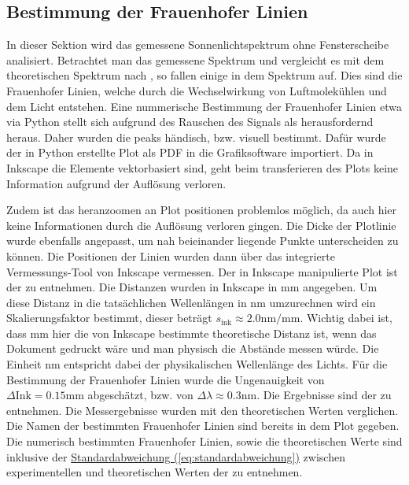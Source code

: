 \subsection{Bestimmung der Frauenhofer Linien}
In dieser Sektion wird das gemessene Sonnenlichtspektrum ohne Fensterscheibe analisiert. Betrachtet man das gemessene Spektrum und vergleicht es mit dem theoretischen Spektrum nach , so fallen einige in dem Spektrum auf. 
Dies sind die Frauenhofer Linien, welche durch die Wechselwirkung von Luftmolekühlen und dem Licht entstehen. Eine nummerische Bestimmung der Frauenhofer Linien etwa via Python stellt sich aufgrund des Rauschen des Signals als herausfordernd heraus. 
Daher wurden die peaks händisch, bzw. visuell bestimmt. Dafür wurde der in Python erstellte Plot als PDF in die Grafiksoftware importiert. Da in Inkscape die Elemente vektorbasiert sind, geht beim transferieren des Plots keine Information aufgrund der Auflösung verloren. 

Zudem ist das heranzoomen an Plot positionen problemlos möglich, da auch hier keine Informationen durch die Auflösung verloren gingen. Die Dicke der Plotlinie wurde ebenfalls angepasst, um nah beieinander liegende Punkte unterscheiden zu können.
Die Positionen der Linien wurden dann über das integrierte Vermessungs-Tool von Inkscape vermessen. Der in Inkscape manipulierte Plot ist der  zu entnehmen. 
Die Distanzen wurden in Inkscape in mm angegeben. Um diese Distanz in die tatsächlichen Wellenlängen in nm umzurechnen wird ein Skalierungsfaktor bestimmt, dieser beträgt $s_\text{ink} \approx 2.0 \mathrm{nm/mm}$. Wichtig dabei ist, dass mm hier die von Inkscape bestimmte theoretische Distanz ist, wenn das Dokument gedruckt wäre und man physisch die Abstände messen würde. Die Einheit nm entspricht dabei der physikalischen Wellenlänge des Lichts.
Für die Bestimmung der Frauenhofer Linien wurde die Ungenauigkeit von $\Delta \text{Ink} = 0.15 \mathrm{mm}$ abgeschätzt, bzw. von $\Delta \lambda \approx 0.3 \mathrm{nm}$. Die Ergebnisse sind der  zu entnehmen. 
Die Messergebnisse wurden mit den theoretischen Werten verglichen. \cite{wikiFL}
Die Namen der bestimmten Frauenhofer Linien sind bereits in dem Plot gegeben. Die numerisch bestimmten Frauenhofer Linien, sowie die theoretischen Werte sind inklusive der \hyperref[eq:standardabweichung]{Standardabweichung (\ref*{eq:standardabweichung})} zwischen experimentellen und theoretischen Werten der  zu entnehmen.

